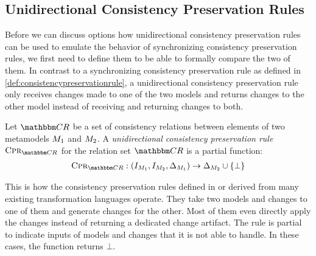 \subsection{Unidirectional Consistency Preservation Rules}

Before we can discuss options how unidirectional consistency preservation rules can be used to emulate the behavior of synchronizing consistency preservation rules, we first need to define them to be able to formally compare the two of them.
In contrast to a synchronizing consistency preservation rule as defined in \autoref{def:consistencypreservationrule}, a unidirectional consistency preservation rule only receives changes made to one of the two models and returns changes to the other model instead of receiving and returning changes to both.

\begin{definition}
    \label{def:unidirectionalconsistencypreservationrule}
    Let $\consistencyrelationset{CR}$ be a set of consistency relations between elements of two metamodels $\metamodel{M}{1}$ and $\metamodel{M}{2}$.
    A \emph{unidirectional consistency preservation rule} $\consistencypreservationrule{\consistencyrelationset{CR}}$ for the relation set $\consistencyrelationset{CR}$ is a partial function:
    \ifisafour\else\vspace{-0.3em}\fi
    \begin{align*}
        \consistencypreservationrule{\consistencyrelationset{CR}} : (\metamodelinstanceset{M}{1}, \metamodelinstanceset{M}{2}, \changeuniverse{\metamodel{M}{1}}) \rightarrow \changeuniverse{\metamodel{M}{2}} \cup \setted{\bot}
    \end{align*}
\end{definition}

This is how the consistency preservation rules defined in or derived from many existing transformation languages operate.
They take two models and changes to one of them and generate changes for the other.
Most of them even directly apply the changes instead of returning a dedicated change artifact.
The rule is partial to indicate inputs of models and changes that it is not able to handle. In these cases, the function returns $\bot$.

